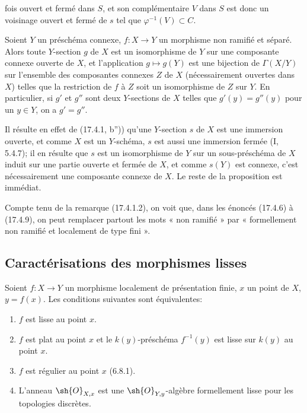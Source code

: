fois ouvert et fermé dans $S$, et son complémentaire $V$ dans $S$ est donc un voisinage ouvert et fermé de $s$ tel que $\varphi^{-1}(V)\subset C$.

\begin{proposition}[17.4.9]
\label{IV.17.4.9}
Soient $Y$ un préschéma connexe, $f:X\to Y$ un morphisme non ramifié et séparé. Alors toute $Y$-section $g$ de $X$ est un isomorphisme de $Y$ sur une composante connexe ouverte de $X$, et l'application $g\mapsto g(Y)$ est une bijection de $\Gamma(X/Y)$ sur l'ensemble des composantes connexes $Z$ de $X$ (nécessairement ouvertes dans $X$) telles que la restriction de $f$ à $Z$ soit un isomorphisme de $Z$ sur $Y$. En particulier, si $g'$ et $g''$ sont deux $Y$-sections de $X$ telles que $g'(y)=g''(y)$ pour un $y\in Y$, on a $g'=g''$.
\end{proposition}

Il résulte en effet de (17.4.1, b'')) qu'une $Y$-section $s$ de $X$ est une immersion ouverte, et comme $X$ est un $Y$-schéma, $s$ est aussi une immersion fermée (I, 5.4.7); il en résulte que $s$ est un isomorphisme de $Y$ sur un sous-préschéma de $X$ induit sur une partie ouverte et fermée de $X$, et comme $s(Y)$ est connexe, c'est nécessairement une composante connexe de $X$. Le reste de la proposition est immédiat.

\begin{remark}[17.4.10]
\label{IV.17.4.10}
Compte tenu de la remarque (17.4.1.2), on voit que, dans les énoncés (17.4.6) à (17.4.9), on peut remplacer partout les mots « non ramifié » par « formellement non ramifié et localement de type fini ».
\end{remark}

\subsection{Caractérisations des morphismes lisses}

\begin{theorem}[17.5.1]
\label{IV.17.5.1}
Soient $f:X\to Y$ un morphisme localement de présentation finie, $x$ un point de $X$, $y=f(x)$. Les conditions suivantes sont équivalentes:
\begin{enumerate}
  \item[a)] $f$ est lisse au point $x$.
  \item[b)] $f$ est plat au point $x$ et le $k(y)$-préschéma $f^{-1}(y)$ est lisse sur $k(y)$ au point $x$.
  \item[b')] $f$ est régulier au point $x$ (6.8.1).
  \item[c)] L'anneau $\sh{O}_{X,x}$ est une $\sh{O}_{Y,y}$-algèbre formellement lisse pour les topologies discrètes.
\end{enumerate}
\end{theorem}

